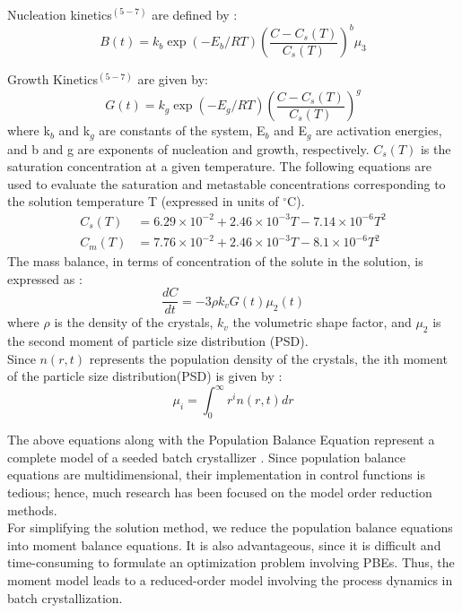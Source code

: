 Nucleation kinetics$^{(5-7)}$ are defined by :
\begin{equation}
B(t) = k_{b}\exp{\left(-E_{b}/RT \right)}\left(\frac{C - C_{s}(T)}{C_{s}(T)}\right)^{b}\mu_{3}
\end{equation}  


Growth Kinetics$^{(5-7)}$ are given by:
\begin{equation}
G(t) = k_{g}\exp{\left(-E_{g}/RT \right)}\left(\frac{C - C_{s}(T)}{C_{s}(T)}\right)^{g}
\end{equation}
where k$_{b}$ and k$_{g}$ are constants of the system, E$_{b}$ and E$_{g}$ are activation energies, and b and g are exponents of nucleation and growth, respectively. $C_{s}(T)$ is the saturation concentration at a given temperature. The following equations are used to evaluate the saturation and metastable concentrations corresponding to the solution temperature T (expressed in units of $^\circ$C)\cite{shi}.
\begin{align}
C_{s}(T) &= 6.29\times10^{-2} + 2.46\times10^{-3}T - 7.14\times10^{-6}T^{2} \\
C_{m}(T) &= 7.76\times10^{-2} + 2.46\times10^{-3}T - 8.1\times10^{-6}T^{2}
\end{align} 
The mass balance, in terms of concentration of the solute in the solution, is expressed as :
\begin{equation}
\frac{dC}{dt} = -3\rho{}k_{v}G(t)\mu_{2}(t)
\end{equation}
where $\rho{}$ is the density of the crystals, $k_{v}$ the volumetric shape factor, and $\mu_{2}$ is the second moment of particle size distribution (PSD).\\

Since $n(r,t)$ represents the population density of the crystals\cite{randolph}, the ith moment of the particle size distribution(PSD) is given by :
\begin{equation}
\mu_{i} = \int_{0}^{\infty} r^{i}n(r,t) dr
\end{equation}

The above equations along with the Population Balance Equation represent a complete model of a seeded batch crystallizer . 
Since population balance equations are multidimensional, their implementation in control functions is tedious; hence, much research has been focused on the model order reduction methods.\\
For simplifying the solution method, we reduce the population balance equations into moment balance equations. It is also advantageous, since it is difficult and time-consuming to formulate an optimization problem involving PBEs. Thus, the moment model leads to a reduced-order model involving the process dynamics in batch crystallization.

